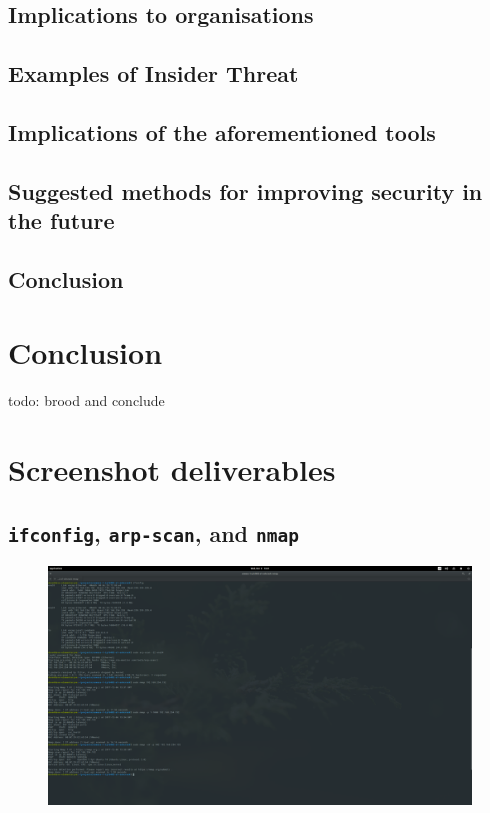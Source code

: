 \documentclass[12pt]{report}
\begin{document}
\section{Implications to organisations}
\section{Examples of Insider Threat}
\section{Implications of the aforementioned tools}
\section{Suggested methods for improving security in the future}
\section{Conclusion}


\pagebreak
\chapter{Conclusion}
todo: brood and conclude




\nocite{example:referenceid:here}

\begin{flushleft}
  
\end{flushleft}


\appendix

\chapter{Screenshot deliverables}
\section{\texttt{ifconfig}, \texttt{arp-scan}, and \texttt{nmap}}
\label{app:screenshots:1}
\begin{figure}[H]
  \centering
  \includegraphics[width=0.7\paperheight, angle=-90]{It's_Elementary_my_dear_Watson!-2017-12-06-13-41-10}
\end{figure}
\end{document}
